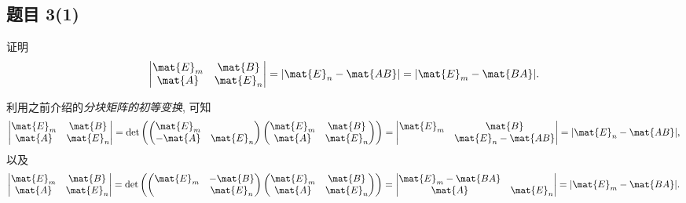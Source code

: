 \subsection*{题目 3(1)}
\begin{problem}
证明
\[
\left|
\begin{matrix}
    \mat{E}_m & \mat{B} \\ \mat{A} & \mat{E}_n
\end{matrix}
\right|
= |\mat{E}_n - \mat{AB}| = |\mat{E}_m - \mat{BA}|.
\]
\end{problem}
\begin{solution}
利用之前介绍的\textit{分块矩阵的初等变换}, 可知
\[
\left|
    \begin{matrix}
        \mat{E}_m & \mat{B} \\ \mat{A} & \mat{E}_n
    \end{matrix}
\right|
=
\det\left(
\begin{pmatrix}
    \mat{E}_m &  \\ -\mat{A} & \mat{E}_n
\end{pmatrix}
\begin{pmatrix}
    \mat{E}_m & \mat{B} \\ \mat{A} & \mat{E}_n
\end{pmatrix}
\right)
=
\left|
\begin{matrix}
    \mat{E}_m & \mat{B} \\  & \mat{E}_n - \mat{AB}
\end{matrix}
\right|
= |\mat{E}_n - \mat{AB}|,
\]
以及
\[
\left|
    \begin{matrix}
        \mat{E}_m & \mat{B} \\ \mat{A} & \mat{E}_n
    \end{matrix}
\right|
=
\det\left(
\begin{pmatrix}
    \mat{E}_m & -\mat{B} \\  & \mat{E}_n
\end{pmatrix}
\begin{pmatrix}
    \mat{E}_m & \mat{B} \\ \mat{A} & \mat{E}_n
\end{pmatrix}
\right)
=
\left|
\begin{matrix}
    \mat{E}_m - \mat{BA} & \\ \mat{A} & \mat{E}_n
\end{matrix}
\right|
= |\mat{E}_m - \mat{BA}|.
\]
\end{solution}